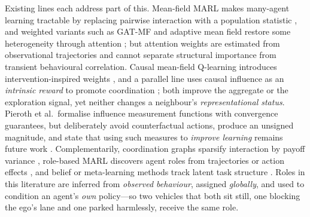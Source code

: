 \documentclass[conference]{IEEEtran}
\begin{document}
Existing lines each address part of this. Mean-field MARL makes many-agent learning tractable by replacing pairwise interaction with a population statistic \cite{yang2018mfmarl}, and weighted variants such as GAT-MF and adaptive mean field restore some heterogeneity through attention \cite{hao2023gatmf, wang2024amf}; but attention weights are estimated from observational trajectories and cannot separate structural importance from transient behavioural correlation. Causal mean-field Q-learning introduces intervention-inspired weights \cite{ma2023cmfq}, and a parallel line uses causal influence as an \emph{intrinsic reward} to promote coordination \cite{jaques2019influence, du2024scic, yu2026magic}; both improve the aggregate or the exploration signal, yet neither changes a neighbour's \emph{representational status}. Pieroth et al.\ formalise influence measurement functions with convergence guarantees, but deliberately avoid counterfactual actions, produce an unsigned magnitude, and state that using such measures to \emph{improve learning} remains future work \cite{pieroth2024influence}. Complementarily, coordination graphs sparsify interaction by payoff variance \cite{boehmer2020dcg, wang2022casec}, role-based MARL discovers agent roles from trajectories or action effects \cite{wang2020roma, wang2021rode, zeng2023sird, hu2024acorm}, and belief or meta-learning methods track latent task structure \cite{nguyen2011baipomdp, zintgraf2020varibad, zhang2024corep}. Roles in this literature are inferred from \emph{observed behaviour}, assigned \emph{globally}, and used to condition an agent's \emph{own} policy---so two vehicles that both sit still, one blocking the ego's lane and one parked harmlessly, receive the same role.
\end{document}
